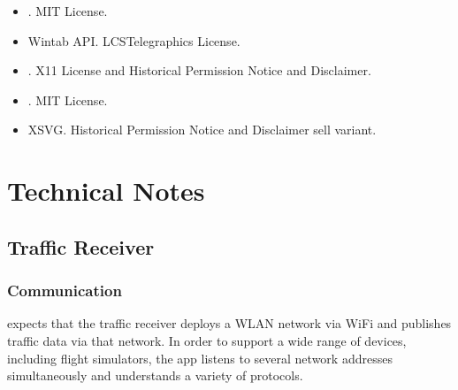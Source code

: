 \documentclass[letterpaper,10pt,english]{sphinxmanual}
\begin{document}
\begin{itemize}
\item {} 
\sphinxAtStartPar
{}%
\begin{footnote}[83]\sphinxAtStartFootnote
{}
%
\end{footnote}. MIT License.

\item {} 
\sphinxAtStartPar
Wintab API. LCS\sphinxhyphen{}Telegraphics License.

\item {} 
\sphinxAtStartPar
{}%
\begin{footnote}[84]\sphinxAtStartFootnote
{}
%
\end{footnote}. X11 License and Historical Permission Notice and Disclaimer.

\item {} 
\sphinxAtStartPar
{}%
\begin{footnote}[85]\sphinxAtStartFootnote
{}
%
\end{footnote}. MIT License.

\item {} 
\sphinxAtStartPar
XSVG. Historical Permission Notice and Disclaimer \sphinxhyphen{} sell variant.

\end{itemize}


\chapter{Technical Notes}
\label{\detokenize{04-appendix/technical:technical-notes}}\label{\detokenize{04-appendix/technical::doc}}

\section{Traffic Receiver}
\label{\detokenize{04-appendix/technical:traffic-receiver}}

\subsection{Communication}
\label{\detokenize{04-appendix/technical:communication}}
\sphinxAtStartPar
{} expects that the traffic receiver deploys a WLAN
network via Wi\sphinxhyphen{}Fi and publishes traffic data via that network.  In order to
support a wide range of devices, including flight simulators, the app listens to
several network addresses simultaneously and understands a variety of protocols.
\end{document}
